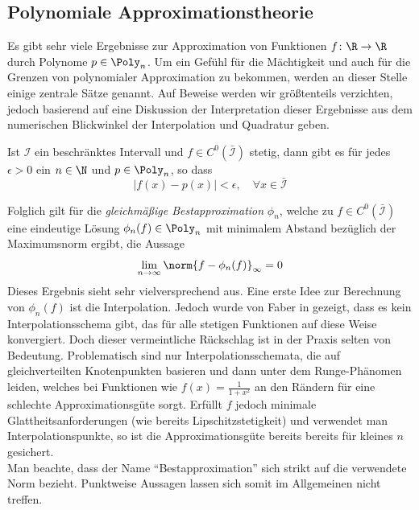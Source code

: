 \subsection{Polynomiale Approximationstheorie}
\label{sec:poly_approx}
Es gibt sehr viele Ergebnisse zur Approximation von Funktionen $f\colon \R\to\R$ durch Polynome $p\in\Poly_n$. Um ein Gefühl für die Mächtigkeit und auch für die Grenzen von polynomialer Approximation zu bekommen, werden an dieser Stelle einige zentrale Sätze genannt. Auf Beweise werden wir größtenteils verzichten, jedoch basierend auf \autocite{Trefethen} eine Diskussion der Interpretation dieser Ergebnisse aus dem numerischen Blickwinkel der Interpolation und Quadratur geben.
\begin{maththeorem}[Weierstrass]
Ist $\mathcal{I}$ ein beschränktes Intervall und $f\in C^0(\bar{\mathcal{I}})$ stetig, dann gibt es für jedes $\epsilon >0$ ein $n\in\N$ und $p\in\Poly_n$, so dass
\[|f(x)-p(x)|<\epsilon,\quad \forall x\in\bar{\mathcal{I}}\]
\end{maththeorem}
Folglich gilt für die \emph{gleichmäßige Bestapproximation} $\phi_n$, welche zu $f\in C^0(\bar{\mathcal{I}})$ eine eindeutige Lösung $\phi_n(f)\in\Poly_n$ mit minimalem Abstand bezüglich der Maximumsnorm ergibt, die Aussage
\[\lim\limits_{n\to\infty}\norm{f-\phi_n(f)}_\infty=0\] 
Dieses Ergebnis sieht sehr vielversprechend aus. Eine erste Idee zur Berechnung von $\phi_n(f)$ ist die Interpolation. Jedoch wurde von Faber in \autocite{faber14} gezeigt, dass es kein Interpolationsschema gibt, das für alle stetigen Funktionen auf diese Weise konvergiert. Doch dieser vermeintliche Rückschlag ist in der Praxis selten von Bedeutung. Problematisch sind nur Interpolationsschemata, die auf gleichverteilten Knotenpunkten basieren und dann unter dem Runge-Phänomen leiden, welches bei Funktionen wie $f(x)=\frac{1}{1+x^2}$ an den Rändern für eine schlechte Approximationsgüte sorgt. Erfüllt $f$ jedoch minimale Glattheitsanforderungen (wie bereits Lipschitzstetigkeit) und verwendet man \chebyspace Interpolationspunkte, so ist die Approximationsgüte bereits bereits für kleines $n$ gesichert.\\
Man beachte, dass der Name "`Bestapproximation"' sich strikt auf die verwendete Norm bezieht. Punktweise Aussagen lassen sich somit im Allgemeinen nicht treffen. 
